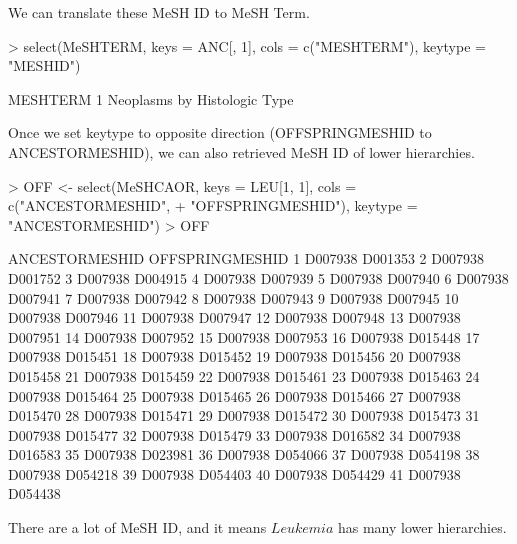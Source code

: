 \documentclass[11pt]{article}
\begin{document}
We can translate these MeSH ID to MeSH Term.
\begin{center}
\begin{Schunk}
\begin{Sinput}
> select(MeSHTERM, keys = ANC[, 1], cols = c("MESHTERM"), keytype = "MESHID")
\end{Sinput}
\begin{Soutput}
                      MESHTERM
1 Neoplasms by Histologic Type
\end{Soutput}
\end{Schunk}
\end{center}

Once we set keytype to opposite direction (OFFSPRINGMESHID to ANCESTORMESHID), we can also retrieved MeSH ID of lower hierarchies.
\begin{center}
\begin{Schunk}
\begin{Sinput}
> OFF <- select(MeSHCAOR, keys = LEU[1, 1], cols = c("ANCESTORMESHID", 
+     "OFFSPRINGMESHID"), keytype = "ANCESTORMESHID")
> OFF
\end{Sinput}
\begin{Soutput}
   ANCESTORMESHID OFFSPRINGMESHID
1         D007938         D001353
2         D007938         D001752
3         D007938         D004915
4         D007938         D007939
5         D007938         D007940
6         D007938         D007941
7         D007938         D007942
8         D007938         D007943
9         D007938         D007945
10        D007938         D007946
11        D007938         D007947
12        D007938         D007948
13        D007938         D007951
14        D007938         D007952
15        D007938         D007953
16        D007938         D015448
17        D007938         D015451
18        D007938         D015452
19        D007938         D015456
20        D007938         D015458
21        D007938         D015459
22        D007938         D015461
23        D007938         D015463
24        D007938         D015464
25        D007938         D015465
26        D007938         D015466
27        D007938         D015470
28        D007938         D015471
29        D007938         D015472
30        D007938         D015473
31        D007938         D015477
32        D007938         D015479
33        D007938         D016582
34        D007938         D016583
35        D007938         D023981
36        D007938         D054066
37        D007938         D054198
38        D007938         D054218
39        D007938         D054403
40        D007938         D054429
41        D007938         D054438
\end{Soutput}
\end{Schunk}
\end{center}
There are a lot of MeSH ID, and it means $Leukemia$ has many lower hierarchies.\\
\end{document}
